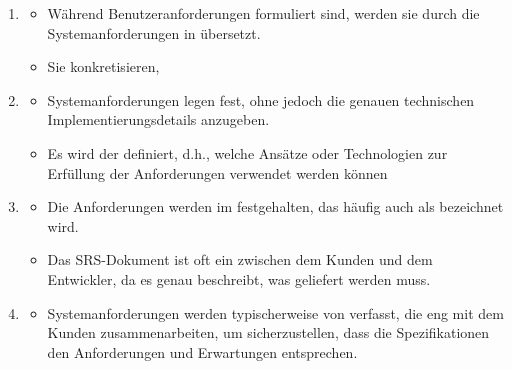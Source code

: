 \begin{infoBox}
    \begin{enumerate}
        \item {}
        \begin{itemize}
            \item Während Benutzeranforderungen  formuliert sind, werden sie durch die Systemanforderungen in  übersetzt.
            \item Sie konkretisieren, 
        \end{itemize}
        \item {}
        \begin{itemize}
            \item Systemanforderungen legen fest,  ohne jedoch die genauen technischen Implementierungsdetails anzugeben.
            \item Es wird der  definiert, d.h., welche Ansätze oder Technologien zur Erfüllung der Anforderungen verwendet werden können
        \end{itemize}
        \item {}
        \begin{itemize}
            \item Die Anforderungen werden im  festgehalten, das häufig auch als  bezeichnet wird.
            \item Das SRS-Dokument ist oft ein  zwischen dem Kunden und dem Entwickler, da es genau beschreibt, was geliefert werden muss.
        \end{itemize}
        \item {}
        \begin{itemize}
            \item Systemanforderungen werden typischerweise von  verfasst, die eng mit dem Kunden zusammenarbeiten, um sicherzustellen, dass die Spezifikationen den Anforderungen und Erwartungen entsprechen.
        \end{itemize}
    \end{enumerate}
\end{infoBox}
